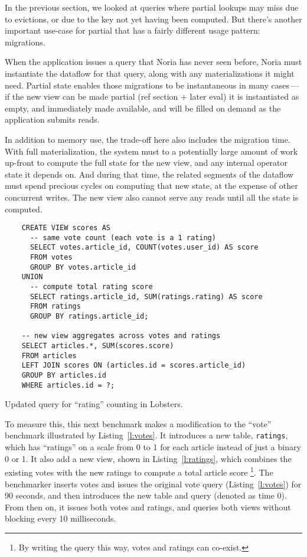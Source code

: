 In the previous section, we looked at queries where partial lookups may miss due
to evictions, or due to the key not yet having been computed. But there's
another important use-case for partial that has a fairly different usage
pattern: migrations.

When the application issues a query that Noria has never seen before, Noria must
instantiate the dataflow for that query, along with any materializations it
might need. Partial state enables those migrations to be instantaneous in many
cases\,---\,if the new view can be made partial (ref section + later eval) it is
instantiated as empty, and immediately made available, and will be filled on
demand as the application submits reads.

In addition to memory use, the trade-off here also includes the migration time.
With full materialization, the system must to a potentially large amount of work
up-front to compute the full state for the new view, and any internal operator
state it depends on. And during that time, the related segments of the dataflow
must spend precious cycles on computing that new state, at the expense of other
concurrent writes. The new view also cannot serve any reads until all the state
is computed.

\begin{listing}[t]
  \begin{verbatim}
    CREATE VIEW scores AS
      -- same vote count (each vote is a 1 rating)
      SELECT votes.article_id, COUNT(votes.user_id) AS score
      FROM votes
      GROUP BY votes.article_id
    UNION
      -- compute total rating score
      SELECT ratings.article_id, SUM(ratings.rating) AS score
      FROM ratings
      GROUP BY ratings.article_id;

    -- new view aggregates across votes and ratings
    SELECT articles.*, SUM(scores.score)
    FROM articles
    LEFT JOIN scores ON (articles.id = scores.article_id)
    GROUP BY articles.id
    WHERE articles.id = ?;
  \end{verbatim}
  \caption{Updated query for ``rating'' counting in Lobsters.}
  \label{l:ratings}
\end{listing}

To measure this, this next benchmark makes a modification to the ``vote''
benchmark illustrated by Listing~\ref{l:votes}. It introduces a new table,
\texttt{ratings}, which has ``ratings'' on a scale from 0 to 1 for each article
instead of just a binary 0 or 1. It also add a new view, shown in
Listing~\ref{l:ratings}, which combines the existing votes with the new ratings
to compute a total article score%
\footnote{By writing the query this way, votes and ratings can co-exist.}.
The benchmarker inserts votes and issues the original vote query
(Listing~\ref{l:votes}) for 90 seconds, and then introduces the new table and
query (denoted as time 0). From then on, it issues both votes and ratings, and
queries both views without blocking every 10 milliseconds.

